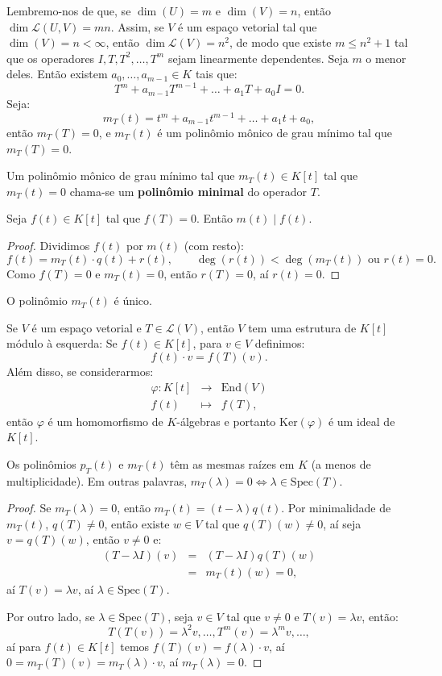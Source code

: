 \documentclass[11pt,twoside,a4paper]{book}
\begin{document}
\noindent
Lembremo-nos de que, se $\dim(U)=m$ e $\dim(V)=n$, então $\dim\mathcal{L}(U,V)=mn$. Assim, se $V$ é um espaço vetorial tal que $\dim(V)=n<\infty$, então $\dim\mathcal{L}(V)=n^2$, de modo que existe $m\leq n^2+1$ tal que os operadores $I,T,T^2,\dots,T^m$ sejam linearmente dependentes. Seja $m$ o menor deles. Então existem $a_0,\dots,a_{m-1}\in K$ tais que:
\[
T^m+a_{m-1}T^{m-1}+\dots+a_1T+a_0I=0.
\]
Seja:
\[
m_T(t)=t^m+a_{m-1}t^{m-1}+\dots+a_1t+a_0,
\]
então $m_T(T)=0$, e $m_T(t)$ é um polinômio mônico de grau mínimo tal que $m_T(T)=0$.

\begin{definicao}
Um polinômio mônico de grau mínimo tal que $m_T(t)\in K[t]$ tal que $m_T(t)=0$ chama-se um \textbf{polinômio minimal} do operador $T$.
\end{definicao}

\begin{lema}
Seja $f(t)\in K[t]$ tal que $f(T)=0$. Então $m(t)\mid f(t)$.
\end{lema}
\begin{proof}
Dividimos $f(t)$ por $m(t)$ (com resto):
\[
f(t)=m_T(t)\cdot q(t)+r(t),\quad\quad\deg(r(t))<\deg(m_T(t))\text{ ou }r(t)=0.
\]
Como $f(T)=0$ e $m_T(t)=0$, então $r(T)=0$, aí $r(t)=0$.
\end{proof}

\begin{corolario}
O polinômio $m_T(t)$ é único.
\end{corolario}

\noindent
Se $V$ é um espaço vetorial e $T\in\mathcal{L}(V)$, então $V$ tem uma estrutura de $K[t]$ módulo à esquerda: Se $f(t)\in K[t]$, para $v\in V$ definimos:
\[
f(t)\cdot v=f(T)(v).
\]
Além disso, se considerarmos:
\[
\begin{array}{rcl}
\varphi:K[t]&\rightarrow&\mathrm{End}(V)\\f(t)&\mapsto&f(T),
\end{array}
\]
então $\varphi$ é um homomorfismo de $K$-álgebras e portanto $\mathrm{Ker}(\varphi)$ é um ideal de $K[t]$.

\begin{teorema}
Os polinômios $p_T(t)$ e $m_T(t)$ têm as mesmas raízes em $K$ (a menos de multiplicidade). Em outras palavras, $m_T(\lambda)=0\Leftrightarrow\lambda\in\mathrm{Spec}(T)$.
\end{teorema}
\begin{proof}
Se $m_T(\lambda)=0$, então $m_T(t)=(t-\lambda)q(t)$. Por minimalidade de $m_T(t)$, $q(T)\neq 0$, então existe $w\in V$ tal que $q(T)(w)\neq 0$, aí seja $v=q(T)(w)$, então $v\neq 0$ e:
\[
\begin{array}{rcl}
(T-\lambda I)(v)&=&(T-\lambda I)q(T)(w)\\&=&m_T(t)(w)=0,
\end{array}
\]
aí $T(v)=\lambda v$, aí $\lambda\in\mathrm{Spec}(T)$.

\medskip
\noindent
Por outro lado, se $\lambda\in\mathrm{Spec}(T)$, seja $v\in V$ tal que $v\neq 0$ e $T(v)=\lambda v$, então:
\[
T(T(v))=\lambda^2 v,\dots,T^m(v)=\lambda^m v,\dots,
\]
aí para $f(t)\in K[t]$ temos $f(T)(v)=f(\lambda)\cdot v$, aí $0=m_T(T)(v)=m_T(\lambda)\cdot v$, aí $m_T(\lambda)=0$.
\end{proof}
\end{document}
